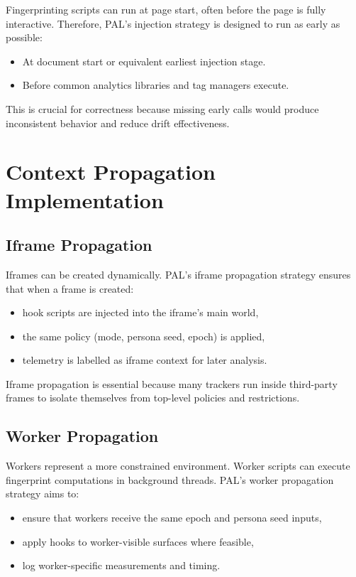 \documentclass[11pt]{report}
\begin{document}
Fingerprinting scripts can run at page start, often before the page is fully interactive. Therefore, PAL’s injection strategy is designed to run as early as possible:

\begin{itemize}
    \item At document start or equivalent earliest injection stage.
    \item Before common analytics libraries and tag managers execute.
\end{itemize}

This is crucial for correctness because missing early calls would produce inconsistent behavior and reduce drift effectiveness.

\section{Context Propagation Implementation}

\subsection{Iframe Propagation}

Iframes can be created dynamically. PAL’s iframe propagation strategy ensures that when a frame is created:

\begin{itemize}
    \item hook scripts are injected into the iframe’s main world,
    \item the same policy (mode, persona seed, epoch) is applied,
    \item telemetry is labelled as iframe context for later analysis.
\end{itemize}

Iframe propagation is essential because many trackers run inside third-party frames to isolate themselves from top-level policies and restrictions.

\subsection{Worker Propagation}

Workers represent a more constrained environment. Worker scripts can execute fingerprint computations in background threads. PAL’s worker propagation strategy aims to:

\begin{itemize}
    \item ensure that workers receive the same epoch and persona seed inputs,
    \item apply hooks to worker-visible surfaces where feasible,
    \item log worker-specific measurements and timing.
\end{itemize}
\end{document}
